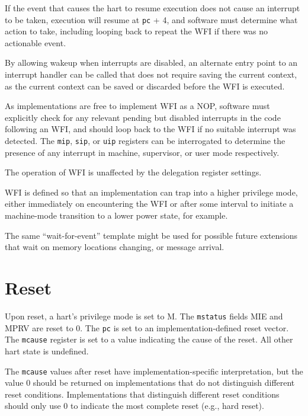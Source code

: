 If the event that causes the hart to resume execution does not cause
an interrupt to be taken, execution will resume at {\tt pc} + 4, and
software must determine what action to take, including looping back to
repeat the WFI if there was no actionable event.

\begin{commentary}
By allowing wakeup when interrupts are disabled, an alternate entry
point to an interrupt handler can be called that does not require
saving the current context, as the current context can be saved or
discarded before the WFI is executed.

As implementations are free to implement WFI as a NOP, software must
explicitly check for any relevant pending but disabled interrupts in
the code following an WFI, and should loop back to the WFI if no
suitable interrupt was detected.  The {\tt mip}, {\tt sip},
or {\tt uip} registers can be interrogated to determine the presence
of any interrupt in machine, supervisor, or user mode
respectively.

The operation of WFI is unaffected by the delegation register settings.

WFI is defined so that an implementation can trap into a higher
privilege mode, either immediately on encountering the WFI or after
some interval to initiate a machine-mode transition to a lower power
state, for example.
\end{commentary}

\begin{commentary}
The same ``wait-for-event'' template might be used for possible future
extensions that wait on memory locations changing, or message
arrival.
\end{commentary}

\section{Reset}
\label{sec:reset}

Upon reset, a hart's privilege mode is set to M.  The {\tt mstatus} fields MIE
and MPRV are reset to 0.  The {\tt pc} is
set to an implementation-defined reset vector.  The {\tt mcause} register is
set to a value indicating the cause of the reset.  All other hart state is
undefined.

The {\tt mcause} values after reset have implementation-specific
interpretation, but the value 0 should be returned on implementations
that do not distinguish different reset conditions. Implementations
that distinguish different reset conditions should only use 0 to
indicate the most complete reset (e.g., hard reset).

